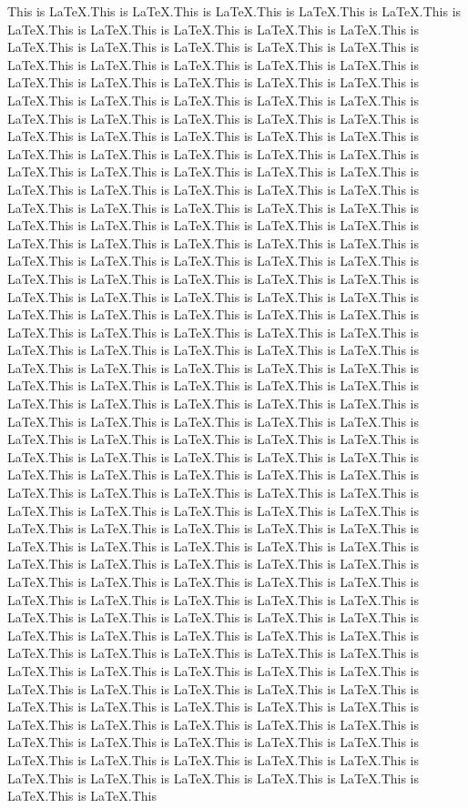\documentclass{article}
\begin{document}
This is \LaTeX.This is \LaTeX.This is \LaTeX.This is \LaTeX.This is \LaTeX.This is \LaTeX.This is \LaTeX.This is \LaTeX.This is \LaTeX.This is \LaTeX.This is \LaTeX.This is \LaTeX.This is \LaTeX.This is \LaTeX.This is \LaTeX.This is \LaTeX.This is \LaTeX.This is \LaTeX.This is \LaTeX.This is \LaTeX.This is \LaTeX.This is \LaTeX.This is \LaTeX.This is \LaTeX.This is \LaTeX.This is \LaTeX.This is \LaTeX.This is \LaTeX.This is \LaTeX.This is \LaTeX.This is \LaTeX.This is \LaTeX.This is \LaTeX.This is \LaTeX.This is \LaTeX.This is \LaTeX.This is \LaTeX.This is \LaTeX.This is \LaTeX.This is \LaTeX.This is \LaTeX.This is \LaTeX.This is \LaTeX.This is \LaTeX.This is \LaTeX.This is \LaTeX.This is \LaTeX.This is \LaTeX.This is \LaTeX.This is \LaTeX.This is \LaTeX.This is \LaTeX.This is \LaTeX.This is \LaTeX.This is \LaTeX.This is \LaTeX.This is \LaTeX.This is \LaTeX.This is \LaTeX.This is \LaTeX.This is \LaTeX.This is \LaTeX.This is \LaTeX.This is \LaTeX.This is \LaTeX.This is \LaTeX.This is \LaTeX.This is \LaTeX.This is \LaTeX.This is \LaTeX.This is \LaTeX.This is \LaTeX.This is \LaTeX.This is \LaTeX.This is \LaTeX.This is \LaTeX.This is \LaTeX.This is \LaTeX.This is \LaTeX.This is \LaTeX.This is \LaTeX.This is \LaTeX.This is \LaTeX.This is \LaTeX.This is \LaTeX.This is \LaTeX.This is \LaTeX.This is \LaTeX.This is \LaTeX.This is \LaTeX.This is \LaTeX.This is \LaTeX.This is \LaTeX.This is \LaTeX.This is \LaTeX.This is \LaTeX.This is \LaTeX.This is \LaTeX.This is \LaTeX.This is \LaTeX.This is \LaTeX.This is \LaTeX.This is \LaTeX.This is \LaTeX.This is \LaTeX.This is \LaTeX.This is \LaTeX.This is \LaTeX.This is \LaTeX.This is \LaTeX.This is \LaTeX.This is \LaTeX.This is \LaTeX.This is \LaTeX.This is \LaTeX.This is \LaTeX.This is \LaTeX.This is \LaTeX.This is \LaTeX.This is \LaTeX.This is \LaTeX.This is \LaTeX.This is \LaTeX.This is \LaTeX.This is \LaTeX.This is \LaTeX.This is \LaTeX.This is \LaTeX.This is \LaTeX.This is \LaTeX.This is \LaTeX.This is \LaTeX.This is \LaTeX.This is \LaTeX.This is \LaTeX.This is \LaTeX.This is \LaTeX.This is \LaTeX.This is \LaTeX.This is \LaTeX.This is \LaTeX.This is \LaTeX.This is \LaTeX.This is \LaTeX.This is \LaTeX.This is \LaTeX.This is \LaTeX.This is \LaTeX.This is \LaTeX.This is \LaTeX.This is \LaTeX.This is \LaTeX.This is \LaTeX.This is \LaTeX.This is \LaTeX.This is \LaTeX.This is \LaTeX.This is \LaTeX.This is \LaTeX.This is \LaTeX.This is \LaTeX.This is \LaTeX.This is \LaTeX.This is \LaTeX.This is \LaTeX.This is \LaTeX.This is \LaTeX.This is \LaTeX.This is \LaTeX.This is \LaTeX.This is \LaTeX.This is \LaTeX.This is \LaTeX.This is \LaTeX.This is \LaTeX.This is \LaTeX.This is \LaTeX.This is \LaTeX.This is \LaTeX.This is \LaTeX.This is \LaTeX.This is \LaTeX.This is \LaTeX.This is \LaTeX.This is \LaTeX.This is \LaTeX.This is \LaTeX.This is \LaTeX.This is \LaTeX.This is \LaTeX.This is \LaTeX.This is \LaTeX.This is \LaTeX.This is \LaTeX.This is \LaTeX.This is \LaTeX.This is \LaTeX.This is \LaTeX.This is \LaTeX.This is \LaTeX.This is \LaTeX.This is \LaTeX.This is \LaTeX.This is \LaTeX.This is \LaTeX.This is \LaTeX.This is \LaTeX.This is \LaTeX.This is \LaTeX.This is \LaTeX.This is \LaTeX.This is \LaTeX.This is \LaTeX.This is \LaTeX.This is \LaTeX.This is \LaTeX.This is \LaTeX.This is \LaTeX.This is \LaTeX.This is \LaTeX.This is \LaTeX.This is \LaTeX.This 
\end{document}
